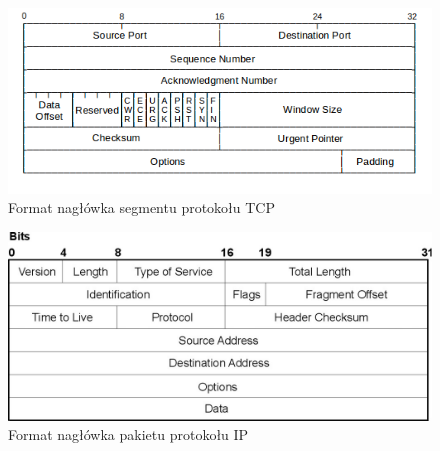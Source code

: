 \documentclass[a4paper, twoside, 12pt]{report}
\begin{document}
        \begin{figure}[h]
                \centering
                \includegraphics[scale=0.6]{tcp_header}
                \caption{Format nagłówka segmentu protokołu TCP}
                \label{TCPHEADER}
        \end{figure}
        \begin{figure}[h]
                \centering
                \includegraphics[scale=0.6]{ip_header}
                \caption{Format nagłówka pakietu protokołu IP}
                \label{IPHEADER}
        \end{figure}
\end{document}
